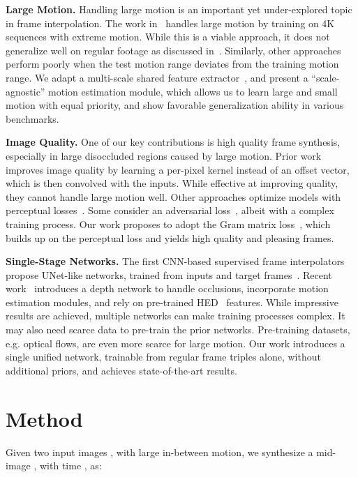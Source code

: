 \documentclass[runningheads]{llncs}
\begin{document}
\vspace{0.05in}
\noindent\textbf{Large Motion.} Handling large motion is an important yet under-explored topic in frame interpolation. The work in~\cite{eXVFI-2021} handles large motion by training on 4K sequences with extreme motion. While this is a viable approach, it does not generalize well on regular footage as discussed in~\cite{abme-2021}. Similarly, other approaches~\cite{softsplat-2020,abme-2021} perform poorly when the test motion range deviates from the training motion range. We adapt a multi-scale shared feature extractor~\cite{fusion-2019,shared-optical-flow1,shared-optical-flow2}, and present a ``scale-agnostic'' motion estimation module, which allows us to learn large and small motion with equal priority, and show favorable generalization ability in various benchmarks. 

\vspace{0.05in}
\noindent\textbf{Image Quality.} One of our key contributions is high quality frame synthesis, especially in large disoccluded regions caused by large motion. Prior work~\cite{sepconv-2017,sepconv-orig,revisiting-sepconv} improves image quality by learning a per-pixel kernel instead of an offset vector, which is then convolved with the inputs. While effective at improving quality, they cannot handle large motion well. Other approaches optimize models with perceptual losses~\cite{sepconv-2017,softsplat-2020}. Some consider an adversarial loss~\cite{deep-gan-loss}, albeit with a complex training process. Our work proposes to adopt the Gram matrix loss~\cite{style-transfer}, which builds up on the perceptual loss and yields high quality and pleasing frames. 

\vspace{0.05in}
\noindent\textbf{Single-Stage Networks.} The first CNN-based supervised frame interpolators propose UNet-like networks, trained from inputs and target frames~\cite{ucf101,superslomo-2017}. Recent work~\cite{dain-2019} introduces a depth network to handle occlusions, \cite{softsplat-2020,abme-2021} incorporate motion estimation modules, and \cite{sun2018pwc,bmbc-2021,zhang2020flexible} rely on pre-trained HED~\cite{xie15hed} features. While impressive results are achieved, multiple networks can make training processes complex. It may also need scarce data to pre-train the prior networks. Pre-training datasets, e.g. optical flows, are even more scarce for large motion. Our work introduces a single unified network, trainable from regular frame triples alone, without additional priors, and achieves state-of-the-art results. \section{Method}
\label{sec:method}
Given two input images , with large in-between motion, we synthesize a mid-image , with time  , as:
\end{document}
